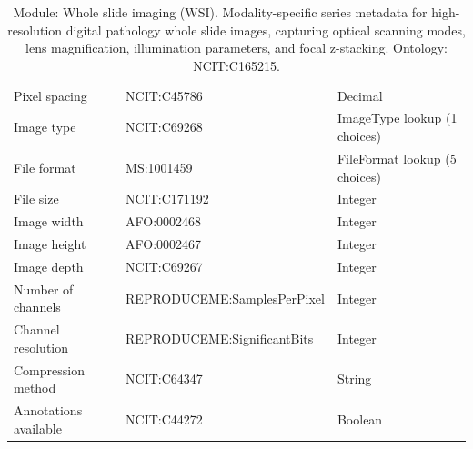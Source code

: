 \documentclass{article}
\begin{document}
\begin{table}[htb]
\begin{tabular}{lll}
Pixel spacing & NCIT:C45786 & Decimal \\
Image type & NCIT:C69268 & ImageType lookup (1 choices) \\
File format & MS:1001459 & FileFormat lookup (5 choices) \\
File size & NCIT:C171192 & Integer \\
Image width & AFO:0002468 & Integer \\
Image height & AFO:0002467 & Integer \\
Image depth & NCIT:C69267 & Integer \\
Number of channels & REPRODUCEME:SamplesPerPixel & Integer \\
Channel resolution & REPRODUCEME:SignificantBits & Integer \\
Compression method & NCIT:C64347 & String \\
Annotations available & NCIT:C44272 & Boolean \\
\hline
\end{tabular}
\caption[Module: Whole slide imaging (WSI)]{\label{table:table15} Module: Whole slide imaging (WSI). Modality-specific series metadata for high-resolution digital pathology whole slide images, capturing optical scanning modes, lens magnification, illumination parameters, and focal z-stacking. Ontology: NCIT:C165215. }
\end{table}
\end{document}
